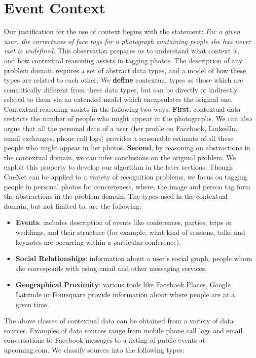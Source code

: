 \section{Event Context}
Our justification for the use of context begins with the statement: \textit{For a given user, the correctness of face tags for a photograph containing people she has never met is undefined}. This observation prepares us to understand what context is, and how contextual reasoning assists in tagging photos. The description of any problem domain requires a set of abstract data types, and a model of how these types are related to each other. We \textbf{define} contextual types as those which are semantically different from these data types, but can be directly or indirectly related to them via an extended model which encapsulates the original one. Contextual reasoning assists in the following two ways. \textbf{First}, contextual data restricts the number of people who might appear in the photographs. We can also argue that all the personal data of a user (her profile on Facebook, LinkedIn, email exchanges, phone call logs) provides a reasonable estimate of all these people who might appear in her photos. \textbf{Second}, by reasoning on abstractions in the contextual domain, we can infer conclusions on the original problem. We exploit this property to develop our algorithm in the later sections. Though CueNet can be applied to a variety of recognition problems, we focus on tagging people in personal photos for concreteness, where, the image and person tag form the abstractions in the problem domain. The types used in the contextual domain, but not limited to, are the following:

\begin{itemize}
\item \textbf{Events}: includes description of events like conferences, parties, trips or weddings, and their structure (for example, what kind of sessions, talks and keynotes are occurring within a particular conference).
\item \textbf{Social Relationships}: information about a user's social graph, people whom she corresponds with using email and other messaging services.
\item \textbf{Geographical Proximity}: various tools like Facebook Places, Google Latitude or Foursquare provide information about where people are at a given time.
\end{itemize}

The above classes of contextual data can be obtained from a variety of data sources. Examples of data sources range from mobile phone call logs and email conversations to Facebook messages to a listing of public events at upcoming.com. We classify sources into the following types:

